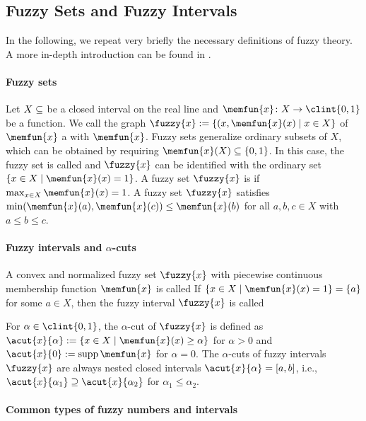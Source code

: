 \subsection{Fuzzy Sets and Fuzzy Intervals}
\label{sec:541fuzzySets}

In the following, we repeat very briefly the necessary
definitions of fuzzy theory.
A more in-depth introduction can be found in
.

\paragraph{Fuzzy sets}

Let $X \subset \real$ be a closed interval on the real line
and $\memfun{x}\colon X \to \clint{0, 1}$ be a function.
We call the graph $\fuzzy{x} := \{(x, \memfun{x}(x) \mid x \in X\}$
of $\memfun{x}$ a  with
 $\memfun{x}$.
Fuzzy sets generalize ordinary subsets of $X$,
which can be obtained by requiring $\memfun{x}(X) \subset \{0, 1\}$.
In this case, the fuzzy set is called  and
$\fuzzy{x}$ can be identified with the ordinary set
$\{x \in X \mid \memfun{x}(x) = 1\}$.
A fuzzy set $\fuzzy{x}$ is 
if $\max_{x \in X} \memfun{x}(x) = 1$.
A  fuzzy set $\fuzzy{x}$ satisfies
$\min(\memfun{x}(a), \memfun{x}(c)) \le \memfun{x}(b)$ for all $a, b, c \in X$
with $a \le b \le c$.

\paragraph{Fuzzy intervals and $\alpha$-cuts}

A convex and normalized fuzzy set $\fuzzy{x}$ with
piecewise continuous membership function $\memfun{x}$ is called
If $\{x \in X \mid \memfun{x}(x) = 1\} = \{a\}$ for some $a \in X$,
then the fuzzy interval $\fuzzy{x}$ is called 

For $\alpha \in \clint{0, 1}$, the $\alpha$-cut of $\fuzzy{x}$ is
defined as $\acut{x}{\alpha} := \{x \in X \mid \memfun{x}(x) \ge \alpha\}$
for $\alpha > 0$ and $\acut{x}{0} := \supp \memfun{x}$ for $\alpha = 0$.
The $\alpha$-cuts of fuzzy intervals $\fuzzy{x}$ are always
nested closed intervals $\acut{x}{\alpha} = [a, b]$, i.e.,
$\acut{x}{\alpha_1} \supset \acut{x}{\alpha_2}$ for $\alpha_1 \le \alpha_2$.

\paragraph{Common types of fuzzy numbers and intervals}

